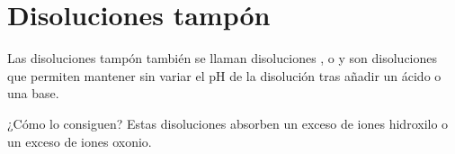 

\section{Disoluciones tampón}\label{sec:disoluciones-tampon}

Las disoluciones tampón también se llaman disoluciones ,  o  y son disoluciones que permiten mantener sin variar el pH de la disolución tras añadir un ácido o una base.

¿Cómo lo consiguen?
Estas disoluciones absorben un exceso de iones hidroxilo o un exceso de iones oxonio.

